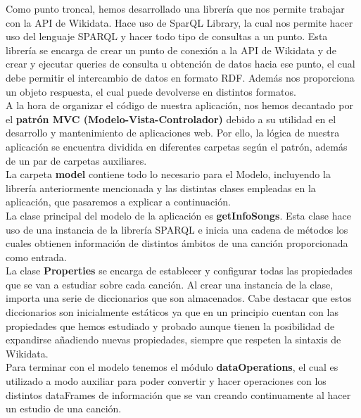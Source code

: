 Como punto troncal, hemos desarrollado una librería que nos permite trabajar con la API de Wikidata. Hace uso de SparQL Library, la cual nos permite hacer uso del lenguaje SPARQL y hacer todo tipo de consultas a un punto. Esta librería se encarga de crear un punto de conexión a la API de Wikidata y de crear y ejecutar queries de consulta u obtención de datos hacia ese punto, el cual debe permitir el intercambio de datos en formato RDF. Además nos proporciona un objeto respuesta, el cual puede devolverse en distintos formatos.\\

A la hora de organizar el código de nuestra aplicación, nos hemos decantado por el \textbf{patrón MVC (Modelo-Vista-Controlador)} debido a su utilidad en el desarrollo y mantenimiento de aplicaciones web. Por ello, la lógica de nuestra aplicación se encuentra dividida en diferentes carpetas según el patrón, además de un par de carpetas auxiliares.\\

La carpeta \textbf{model} contiene todo lo necesario para el Modelo, incluyendo la librería anteriormente mencionada y las distintas clases empleadas en la aplicación, que pasaremos a explicar a continuación.\\

La clase principal del modelo de la aplicación es \textbf{getInfoSongs}. Esta clase hace uso de una instancia de la librería SPARQL e inicia una cadena de métodos los cuales obtienen información de distintos ámbitos de una canción proporcionada como entrada.\\

La clase \textbf{Properties} se encarga de establecer y configurar todas las propiedades que se van a estudiar sobre cada canción. Al crear una instancia de la clase, importa una serie de diccionarios que son almacenados. Cabe destacar que estos diccionarios son inicialmente estáticos ya que en un principio cuentan con las propiedades que hemos estudiado y probado aunque tienen la posibilidad de expandirse añadiendo nuevas propiedades, siempre que respeten la sintaxis de Wikidata. \\

Para terminar con el modelo tenemos el módulo \textbf{dataOperations}, el cual es utilizado a modo auxiliar para poder convertir y hacer operaciones con los distintos dataFrames de información que se van creando continuamente al hacer un estudio de una canción.\\

